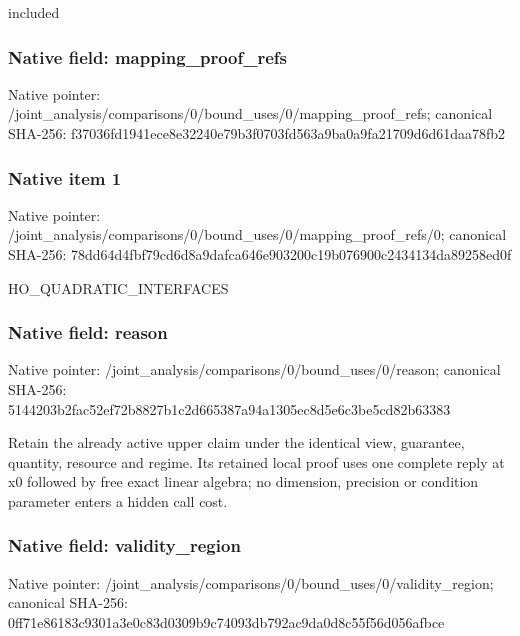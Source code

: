 \documentclass[10pt,a4paper]{article}
\begin{document}
\begingroup\raggedright\sloppy included\par\endgroup

\subsubsection{Native field: mapping\_\allowbreak{}proof\_\allowbreak{}refs}
Native pointer: /joint\_\allowbreak{}analysis/comparisons/0/bound\_\allowbreak{}uses/0/mapping\_\allowbreak{}proof\_\allowbreak{}refs; canonical SHA-256: f37036fd1941ece8e32240e79b3f0703fd563a9ba0a9fa21709d6d61daa78fb2

\subsubsection{Native item 1}
Native pointer: /joint\_\allowbreak{}analysis/comparisons/0/bound\_\allowbreak{}uses/0/mapping\_\allowbreak{}proof\_\allowbreak{}refs/0; canonical SHA-256: 78dd64d4fbf79cd6d8a9dafca646e903200c19b076900c2434134da89258ed0f

\begingroup\raggedright\sloppy HO\_\allowbreak{}QUADRATIC\_\allowbreak{}INTERFACES\par\endgroup

\subsubsection{Native field: reason}
Native pointer: /joint\_\allowbreak{}analysis/comparisons/0/bound\_\allowbreak{}uses/0/reason; canonical SHA-256: 5144203b2fac52ef72b8827b1c2d665387a94a1305ec8d5e6c3be5cd82b63383

\begingroup\raggedright\sloppy Retain the already active upper claim under the identical view,\allowbreak{} guarantee,\allowbreak{} quantity,\allowbreak{} resource and regime. Its retained local proof uses one complete reply at x0 followed by free exact linear algebra;\allowbreak{} no dimension,\allowbreak{} precision or condition parameter enters a hidden call cost.\par\endgroup

\subsubsection{Native field: validity\_\allowbreak{}region}
Native pointer: /joint\_\allowbreak{}analysis/comparisons/0/bound\_\allowbreak{}uses/0/validity\_\allowbreak{}region; canonical SHA-256: 0ff71e86183c9301a3e0c83d0309b9c74093db792ac9da0d8c55f56d056afbce
\end{document}
